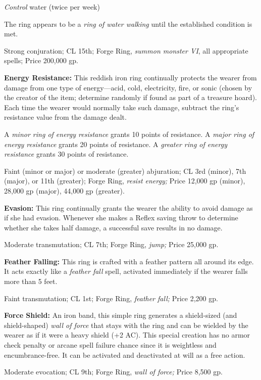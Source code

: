 \textit{Control }water (twice per week)

The ring appears to be a \textit{ring of water walking }until the established condition 
is met.

Strong conjuration; CL 15th; Forge Ring, \textit{summon monster VI}, all appropriate 
spells; Price 200,000 gp.

\textbf{Energy Resistance:} This reddish iron ring continually protects the wearer 
from damage from one type of energy---acid, cold, electricity, fire, or sonic (chosen 
by the creator of the item; determine randomly if found as part of a treasure hoard). 
Each time the wearer would normally take such damage, subtract the ring's resistance 
value from the damage dealt.

A \textit{minor ring of energy resistance }grants 10 points of resistance. A \textit{major 
ring of energy resistance }grants 20 points of resistance. A \textit{greater ring 
of energy resistance }grants 30 points of resistance.

Faint (minor or major) or moderate (greater) abjuration; CL 3rd  (minor), 7th (major), 
or 11th (greater); Forge Ring, \textit{resist energy; }Price 12,000 gp (minor), 
28,000 gp (major), 44,000 gp (greater).

\textbf{Evasion:} This ring continually grants the wearer the ability to avoid 
damage as if she had evasion. Whenever she makes a Reflex saving throw to determine 
whether she takes half damage, a successful save results in no damage.

Moderate transmutation; CL 7th; Forge Ring, \textit{jump; }Price 25,000 gp.

\textbf{Feather Falling:} This ring is crafted with a feather pattern all around 
its edge. It acts exactly like a \textit{feather fall }spell, activated immediately 
if the wearer falls more than 5 feet.

Faint transmutation; CL 1st; Forge Ring, \textit{feather fall; }Price 2,200 gp.

\textbf{Force Shield:} An iron band, this simple ring generates a shield-sized 
(and shield-shaped) \textit{wall of force }that stays with the ring and can be 
wielded by the wearer as if it were a heavy shield (+2 AC). This special creation 
has no armor check penalty or arcane spell failure chance since it is weightless 
and encumbrance-free. It can be activated and deactivated at will as a free action.

Moderate evocation; CL 9th; Forge Ring, \textit{wall of force; }Price 8,500 gp.

